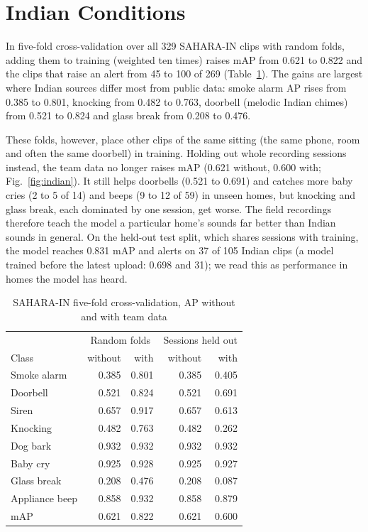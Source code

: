 \documentclass[12pt,a4paper,oneside]{report}
\begin{document}
\section{Indian Conditions}
In five-fold cross-validation over all 329 SAHARA-IN clips with random folds, adding them to training (weighted ten times) raises mAP from 0.621 to 0.822 and the clips that raise an alert from 45 to 100 of 269 (Table~\ref{tab:cv}). The gains are largest where Indian sources differ most from public data: smoke alarm AP rises from 0.385 to 0.801, knocking from 0.482 to 0.763, doorbell (melodic Indian chimes) from 0.521 to 0.824 and glass break from 0.208 to 0.476.

These folds, however, place other clips of the same sitting (the same phone, room and often the same doorbell) in training. Holding out whole recording sessions instead, the team data no longer raises mAP (0.621 without, 0.600 with; Fig.~\ref{fig:indian}). It still helps doorbells (0.521 to 0.691) and catches more baby cries (2 to 5 of 14) and beeps (9 to 12 of 59) in unseen homes, but knocking and glass break, each dominated by one session, get worse. The field recordings therefore teach the model a particular home's sounds far better than Indian sounds in general. On the held-out test split, which shares sessions with training, the model reaches 0.831 mAP and alerts on 37 of 105 Indian clips (a model trained before the latest upload: 0.698 and 31); we read this as performance in homes the model has heard.

\begin{table}[h]
\caption{SAHARA-IN five-fold cross-validation, AP without and with team data}
\label{tab:cv}
\centering\small
\begin{tabular}{@{}lrrrr@{}}
\toprule
 & \multicolumn{2}{c}{Random folds} & \multicolumn{2}{c}{Sessions held out}\\
Class & without & with & without & with\\
\midrule
Smoke alarm & 0.385 & 0.801 & 0.385 & 0.405\\
Doorbell & 0.521 & 0.824 & 0.521 & 0.691\\
Siren & 0.657 & 0.917 & 0.657 & 0.613\\
Knocking & 0.482 & 0.763 & 0.482 & 0.262\\
Dog bark & 0.932 & 0.932 & 0.932 & 0.932\\
Baby cry & 0.925 & 0.928 & 0.925 & 0.927\\
Glass break & 0.208 & 0.476 & 0.208 & 0.087\\
Appliance beep & 0.858 & 0.932 & 0.858 & 0.879\\
\midrule
mAP & 0.621 & 0.822 & 0.621 & 0.600\\
\bottomrule
\end{tabular}
\end{table}
\end{document}
